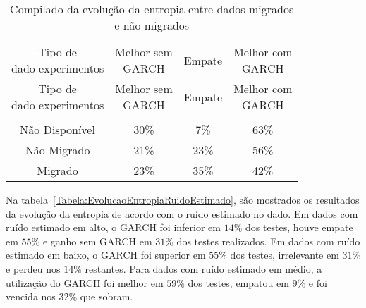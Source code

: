  \begin{center}
\begin{longtable}{cccc}
\toprule
\rowcolor{white}
 \caption{Compilado da evolução da entropia entre dados migrados e não
 migrados} \label{Tabela:EvolucaoEntropiaMigradoNaoMigrado} \\
\midrule
\rowcolor{white}
   \specialcell{Tipo de\\dado experimentos} & \specialcell{Melhor sem\\GARCH} &
   Empate & \specialcell{Melhor com\\GARCH} \\
\midrule
\endfirsthead
\midrule
\rowcolor{white}
   \specialcell{Tipo de\\dado experimentos} & \specialcell{Melhor sem\\GARCH} &
   Empate & \specialcell{Melhor com\\GARCH} \\
\toprule
\endhead
\midrule \\ %
\endfoot
\bottomrule
\endlastfoot
    Não Disponível   & 30\%  & 7\%   & 63\% \\
    Não Migrado & 21\%  & 23\%  & 56\% \\
    Migrado & 23\%  & 35\%  & 42\% \\
\end{longtable}
\end{center}

Na tabela~\ref{Tabela:EvolucaoEntropiaRuidoEstimado}, são mostrados os
resultados da evolução da entropia de acordo com o ruído estimado no dado. Em
dados com ruído estimado em alto, o GARCH foi inferior em $14\%$ dos testes,
houve empate em $55\%$ e ganho sem GARCH em $31\%$ dos testes realizados. Em
dados com ruído estimado em baixo, o GARCH foi superior em $55\%$ dos testes,
irrelevante em $31\%$ e perdeu nos $14\%$ restantes. Para dados com ruído
estimado em médio, a utilização do GARCH foi melhor em $59\%$ dos testes,
empatou em $9\%$ e foi vencida nos $32\%$ que sobram.

